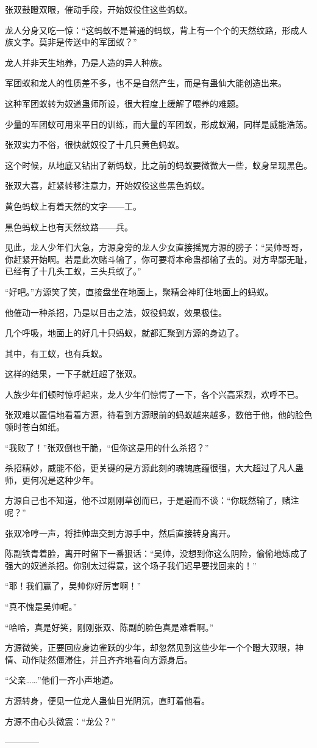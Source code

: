 \begin{this_body}
张双鼓瞪双眼，催动手段，开始奴役住这些蚂蚁。

龙人分身又吃一惊：“这蚂蚁不是普通的蚂蚁，背上有一个个的天然纹路，形成人族文字。莫非是传送中的军团蚁？”

龙人并非天生地养，乃是人造的异人种族。

军团蚁和龙人的性质差不多，也不是自然产生，而是有蛊仙大能创造出来。

这种军团蚁转为奴道蛊师所设，很大程度上缓解了喂养的难题。

少量的军团蚁可用来平日的训练，而大量的军团蚁，形成蚁潮，同样是威能浩荡。

张双实力不俗，很快就奴役了十几只黄色蚂蚁。

这个时候，从地底又钻出了新蚂蚁，比之前的蚂蚁要微微大一些，蚁身呈现黑色。

张双大喜，赶紧转移注意力，开始奴役这些黑色蚂蚁。

黄色蚂蚁上有着天然的文字——工。

黑色蚂蚁上也有天然纹路——兵。

见此，龙人少年们大急，方源身旁的龙人少女直接摇晃方源的膀子：“吴帅哥哥，你赶紧开始啊。若是此次赌斗输了，你可要将本命蛊都输了去的。对方卑鄙无耻，已经有了十几头工蚁，三头兵蚁了。”

“好吧。”方源笑了笑，直接盘坐在地面上，聚精会神盯住地面上的蚂蚁。

他催动一种杀招，乃是以目击之法，奴役蚂蚁，效果极佳。

几个呼吸，地面上的好几十只蚂蚁，就都汇聚到方源的身边了。

其中，有工蚁，也有兵蚁。

这样的结果，一下子就赶超了张双。

人族少年们顿时惊呼起来，龙人少年们惊愕了一下，各个兴高采烈，欢呼不已。

张双难以置信地看着方源，待看到方源眼前的蚂蚁越来越多，数倍于他，他的脸色顿时苍白如纸。

“我败了！”张双倒也干脆，“但你这是用的什么杀招？”

杀招精妙，威能不俗，更关键的是方源此刻的魂魄底蕴很强，大大超过了凡人蛊师，更何况是这种少年。

方源自己也不知道，他不过刚刚草创而已，于是避而不谈：“你既然输了，赌注呢？”

张双冷哼一声，将挂帅蛊交到方源手中，然后直接转身离开。

陈副铁青着脸，离开时留下一番狠话：“吴帅，没想到你这么阴险，偷偷地炼成了强大的奴道杀招。你别太过得意，这个场子我们迟早要找回来的！”

“耶！我们赢了，吴帅你好厉害啊！”

“真不愧是吴帅呢。”

“哈哈，真是好笑，刚刚张双、陈副的脸色真是难看啊。”

方源微笑，正要回应身边雀跃的少年，却忽然见到这些少年一个个瞪大双眼，神情、动作陡然僵滞住，并且齐齐地看向方源身后。

“父亲……”他们一齐小声地道。

方源转身，便见一位龙人蛊仙目光阴沉，直盯着他看。

方源不由心头微震：“龙公？”

------------

\end{this_body}

